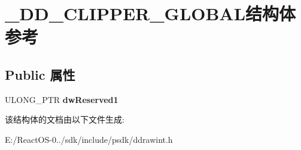 \hypertarget{struct___d_d___c_l_i_p_p_e_r___g_l_o_b_a_l}{}\section{\+\_\+\+D\+D\+\_\+\+C\+L\+I\+P\+P\+E\+R\+\_\+\+G\+L\+O\+B\+A\+L结构体 参考}
\label{struct___d_d___c_l_i_p_p_e_r___g_l_o_b_a_l}
\subsection*{Public 属性}
\begin{DoxyCompactItemize}
\item 
\mbox{\label{struct___d_d___c_l_i_p_p_e_r___g_l_o_b_a_l_a52bebda56f06c9d5d704fcd7a7230729}} 
U\+L\+O\+N\+G\+\_\+\+P\+TR {\bfseries dw\+Reserved1}
\end{DoxyCompactItemize}


该结构体的文档由以下文件生成\+:\begin{DoxyCompactItemize}
\item 
E\+:/\+React\+O\+S-\/0../sdk/include/psdk/ddrawint.\+h\end{DoxyCompactItemize}

